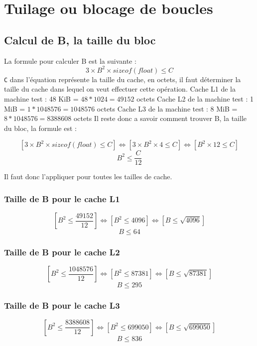 \documentclass{rapport}
\begin{document}
\section{Tuilage ou blocage de boucles}
\subsection{Calcul de B, la taille du bloc}
La formule pour calculer B est la suivante :
\[
  3 \times B^{2} \times sizeof(float) \leq C
\]
\newline
\texttt{C} dans l'équation représente la taille du cache, en octets, il faut déterminer la taille du cache dans lequel on veut effectuer cette opération.\newline\newline
Cache L1 de la machine test : 48 KiB = $48 * 1024 = 49152$ octets\newline
Cache L2 de la machine test : 1 MiB = $1 * 1048576 = 1048576$ octets\newline
Cache L3 de la machine test : 8 MiB = $8 * 1048576 = 8388608$ octets\newline
Il reste donc a savoir comment trouver B, la taille du bloc, la formule est :

\[
  [ 3 \times B^{2} \times sizeof(float) \leq C ] \Leftrightarrow [ 3 \times B^{2} \times 4 \leq C ] \Leftrightarrow [ B^{2} \times 12 \leq C ] 
\]
\[
  B^{2} \leq \frac{C}{12}
\]

Il faut donc l'appliquer pour toutes les tailles de cache.

\subsubsection{Taille de B pour le cache L1}
\[
  [ B^{2} \leq \frac{49152}{12} ] \Leftrightarrow [ B^{2} \leq 4096 ] \Leftrightarrow [ B \leq \sqrt{4096} ] 
\]
\[
 B \leq 64
\]
\subsubsection{Taille de B pour le cache L2}
\[
  [ B^{2} \leq \frac{1048576}{12} ] \Leftrightarrow [ B^{2} \leq 87381 ] \Leftrightarrow [ B \leq \sqrt{87381} ]
\]
\[
  B \leq 295
\]
\subsubsection{Taille de B pour le cache L3}
\[
  [ B^{2} \leq \frac{8388608}{12} ] \Leftrightarrow [ B^{2} \leq 699050 ] \Leftrightarrow [ B \leq \sqrt{699050} ]
\]
\[
  B \leq 836
\]
\end{document}
